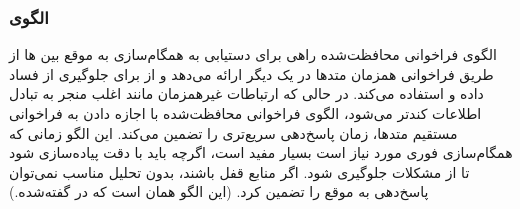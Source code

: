 \subsubsection{الگوی }
\label{archConGuardCallSec}
\begin{RTL}
الگوی فراخوانی محافظت‌شده راهی برای دستیابی به همگام‌سازی به موقع بین
ها از طریق فراخوانی همزمان متدها در یک
 دیگر ارائه می‌دهد و از  
برای جلوگیری از فساد داده و  استفاده می‌کند.
در حالی که ارتباطات غیرهمزمان مانند 
اغلب منجر به تبادل اطلاعات کندتر می‌شود، الگوی فراخوانی محافظت‌شده
با اجازه دادن به فراخوانی مستقیم متدها، زمان پاسخ‌دهی سریع‌تری را تضمین می‌کند.
این الگو زمانی که همگام‌سازی فوری مورد نیاز است بسیار مفید است،
اگرچه باید با دقت پیاده‌سازی شود تا از مشکلات 
جلوگیری شود. اگر منابع قفل باشند، بدون تحلیل مناسب نمی‌توان پاسخ‌دهی به موقع
را تضمین کرد.
(این الگو همان  است که در
\cite{ref1} گفته‌شده.)
\end{RTL}